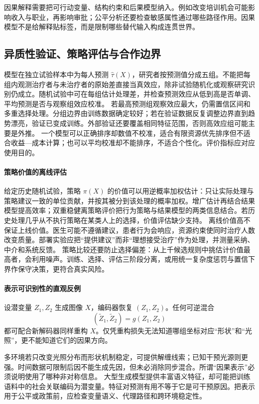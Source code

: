 因果解释需要把可行动变量、结构约束和后果模型纳入。例如改变培训机会可能影响收入与职业，再影响审批；公平分析还要检查敏感属性通过哪些路径作用。因果模型不是给解释贴标签，而是限制哪些替代输入构成连贯世界。

\subsection{异质性验证、策略评估与合作边界}

模型在独立试验样本中为每人预测 $\widehat\tau(X)$，研究者按预测值分成五组。不能把每组内观测治疗者与未治疗者的原始差直接当真效应，除非试验随机化或观察研究识别仍成立。随机试验中可在每组估计处理差，并检查预测效应从低到高是否单调、平均预测是否与观察组效应校准。
若最高预测组观察效应最大，仍需置信区间和多重选择处理。分组边界由训练数据确定较好；若在验证数据反复调整边界直到趋势漂亮，验证已变成训练。外部验证还要覆盖相同特征范围，否则高效应组可能主要是外推。
一个模型可以正确排序却数值不校准，适合有限资源优先排序但不适合收益---成本计算；也可以平均校准却不能排序，不适合个性化。评价指标应对应使用目的。

\paragraph{策略价值的离线评估}

给定历史随机试验，策略 $\pi(X)$ 的价值可以用逆概率加权估计：只让实际处理与策略建议一致的单位贡献，并按其被分到该处理的概率加权。增广估计再结合结果模型提高效率；双重稳健离策略评价把行为策略与结果模型的两类信息结合\parencite{dudik2011}。若历史处理几乎从不执行策略在某类人上的选择，价值评估缺少支持。
离线价值高不保证上线价值。医生可能不遵循建议，患者行为会响应，资源约束使同时治疗人数改变质量。部署实验应把“提供建议”而非“理想接受治疗”作为处理，并测量采纳、中介和系统反馈。
策略比较还要防止选择偏差：从上千候选规则中挑估计价值最高者，会利用噪声。训练、选择、评估三阶段分离，或用统一复杂度惩罚与置信下界作保守决策，更符合真实风险。

\paragraph{表示可识别性的直观反例}

设潜变量 $Z_1,Z_2$ 生成图像 $X$，编码器恢复 $(Z_1,Z_2)$。任何可逆混合
\[
(\widetilde Z_1,\widetilde Z_2)=g(Z_1,Z_2)
\]
都可配合新解码器同样重构 $X$。仅凭重构损失无法知道哪组坐标对应“形状”和“光照”，更不能知道它们的因果方向。

多环境若只改变光照分布而形状机制稳定，可提供解缠线索；已知干预光源则更强。时间数据可限制后因不能生成先因，但未必消除同步混合。所谓“因果表示”必须说明使用了哪种非对称信息。
大型生成模型提供丰富语义特征，却可能把训练语料中的社会关联编码为潜变量。特征对预测有用不等于它是可干预原因。把表示用于公平或政策前，应检查变量语义、代理路径和跨环境稳定性。

